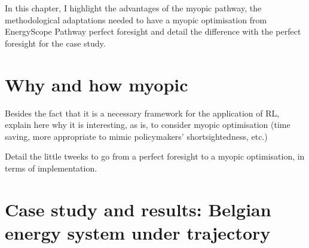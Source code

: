 In this chapter, I highlight the advantages of the myopic pathway, the methodological adaptations needed to have a myopic optimisation from EnergyScope Pathway perfect foresight and detail the difference with the perfect foresight for the case study. 

\section{Why and how myopic}
\label{sec:chap3_why_how}
Besides the fact that it is a necessary framework for the application of RL,  explain here why it is interesting, as is, to consider myopic optimisation (time saving, more appropriate to mimic policymakers' shortsightedness, etc.)

Detail the little tweeks to go from a perfect foresight to a myopic optimisation, in terms of implementation.

\section{Case study and results: Belgian energy system under  trajectory}
\label{sec:chap3_case_study_results}

